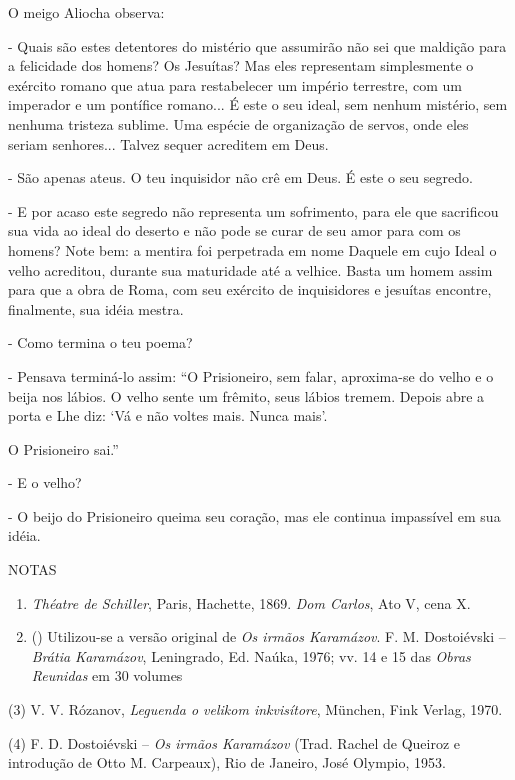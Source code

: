 O meigo Aliocha observa:

- Quais são estes detentores do mistério que assumirão não sei que
maldição para a felicidade dos homens? Os Jesuítas? Mas eles representam
simplesmente o exército romano que atua para restabelecer um império
terrestre, com um imperador e um pontífice romano... É este o seu ideal,
sem nenhum mistério, sem nenhuma tristeza sublime. Uma espécie de
organização de servos, onde eles seriam senhores... Talvez sequer
acreditem em Deus.

- São apenas ateus. O teu inquisidor não crê em Deus. É este o seu
segredo.

- E por acaso este segredo não representa um sofrimento, para ele que
sacrificou sua vida ao ideal do deserto e não pode se curar de seu amor
para com os homens? Note bem: a mentira foi perpetrada em nome Daquele
em cujo Ideal o velho acreditou, durante sua maturidade até a velhice.
Basta um homem assim para que a obra de Roma, com seu exército de
inquisidores e jesuítas encontre, finalmente, sua idéia mestra.

- Como termina o teu poema?

- Pensava terminá-lo assim: ``O Prisioneiro, sem falar, aproxima-se do
velho e o beija nos lábios. O velho sente um frêmito, seus lábios
tremem. Depois abre a porta e Lhe diz: `Vá e não voltes mais. Nunca
mais'.

O Prisioneiro sai.''

- E o velho?

- O beijo do Prisioneiro queima seu coração, mas ele continua impassível
em sua idéia.

NOTAS

\begin{enumerate}
\def\labelenumi{(\arabic{enumi})}
\item
  \emph{Théatre de Schiller}, Paris, Hachette, 1869. \emph{Dom Carlos},
  Ato V, cena X.
\item
  () Utilizou-se a versão original de \emph{Os irmãos Karamázov}. F. M.
  Dostoiévski -- \emph{Brátia Karamázov}, Leningrado, Ed. Naúka, 1976;
  vv. 14 e 15 das \emph{Obras Reunidas} em 30 volumes
\end{enumerate}

(3) V. V. Rózanov, \emph{Leguenda o velikom inkvisítore}, München, Fink
Verlag, 1970.

(4) F. D. Dostoiévski -- \emph{Os irmãos Karamázov} (Trad. Rachel de
Queiroz e introdução de Otto M. Carpeaux), Rio de Janeiro, José Olympio,
1953.

